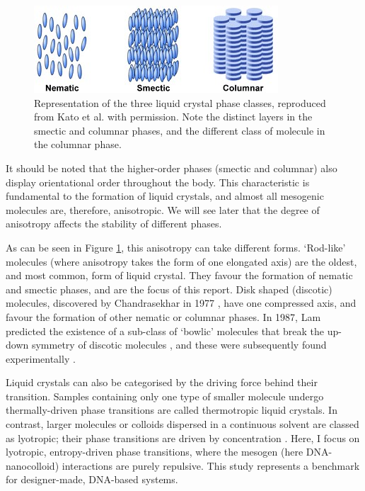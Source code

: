 \documentclass[11pt, a4paper]{article} %
\begin{document}
\begin{figure} [!ht]
	\centering
	\includegraphics[width=0.7\linewidth]{Figures/lc_phases_cropped}
	\caption{Representation of the three liquid crystal phase classes, reproduced from Kato et al. \cite{Kato2007} with permission. Note the distinct layers in the smectic and columnar phases, and the different class of molecule in the columnar phase.}
	\label{fig:lcphasescropped}
\end{figure}


It should be noted that the higher-order phases (smectic and columnar) also display orientational order throughout the body. This characteristic is fundamental to the formation of liquid crystals, and almost all mesogenic molecules are, therefore, anisotropic. We will see later that the degree of anisotropy affects the stability of different phases. 

As can be seen in Figure \ref{fig:lcphasescropped}, this anisotropy can take different forms. `Rod-like' molecules (where anisotropy takes the form of one elongated axis) are the oldest, and most common, form of liquid crystal. They favour the formation of nematic and smectic phases, and are the focus of this report. Disk shaped (discotic) molecules, discovered by Chandrasekhar in 1977 \cite{Chandrasekhar1977}, have one compressed axis, and favour the formation of other nematic or columnar phases. In 1987, Lam predicted the existence of a sub-class of `bowlic' molecules that break the up-down symmetry of discotic molecules \cite{LinLei1988}, and these were subsequently found experimentally \cite{Zimmermann1985, Malthete1985}.

Liquid crystals can also be categorised by the driving force behind their transition. Samples containing only one type of smaller molecule undergo thermally-driven phase transitions are called thermotropic liquid crystals. In contrast, larger molecules or colloids dispersed in a continuous solvent are classed as lyotropic; their phase transitions are driven by concentration \cite{DeGennes1993}. Here, I focus on lyotropic, entropy-driven phase transitions, where the mesogen (here DNA-nanocolloid) interactions are purely repulsive. This study represents a benchmark for designer-made, DNA-based systems.
\end{document}
